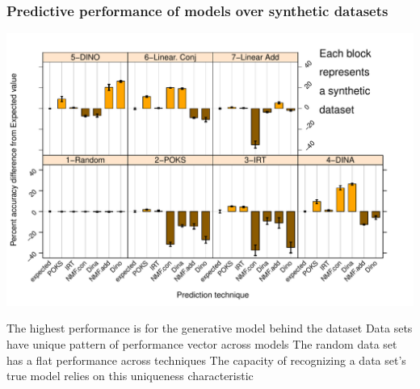 \documentclass{beamer}
\begin{document}
\begin{frame}\frametitle{Predictive performance of models over synthetic datasets}
\vspace{-0.5cm}
\includegraphics[scale =0.45] {images/Syn}
\begin{overprint}
       \small The highest performance is for the generative model behind the dataset
	  \onslide<2> \small Data sets have unique pattern of performance vector across models
      The random data set has a flat performance across techniques 
	  \onslide<4> The capacity of recognizing a data set’s true model relies on this uniqueness characteristic
\end{overprint}
\end{frame}
\end{document}
